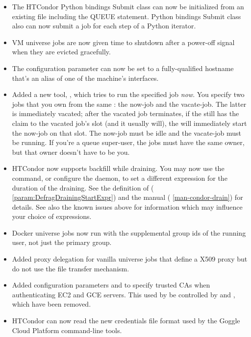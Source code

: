 \begin{itemize}

\item The HTCondor Python bindings Submit class can now be initialized from an existing
 file including the QUEUE statement.  Python bindings Submit
class also can now submit a job for each step of a Python iterator.

\item VM universe jobs are now given time to shutdown after a power-off
signal when they are evicted gracefully.

\item The  configuration parameter can now be
set to a fully-qualified hostname that's an alias of one of the machine's
interfaces.

\item Added a new tool, , which tries to run the specified job
\emph{now}.  You specify two jobs that you own from the same : the
now-job and the vacate-job.  The latter is immediately vacated; after the
vacated job terminates, if the  still has the claim to the vacated job's
slot (and it usually will), the  will immediately start the now-job on
that slot.  The now-job must be idle and the vacate-job must be running.  If
you're a queue super-user, the jobs must have the same owner, but that owner
doesn't have to be you.

\item HTCondor now supports backfill while draining.  You may now use the
 command, or configure the  daemon, to set a
different  expression for the duration of the draining.  See
the definition of  (
\ref{param:DefragDrainingStartExpr}) and the  manual (
\ref{man-condor-drain}) for details.  See also the known issues above for
information which may influence your choice of  expressions.

\item Docker universe jobs now run with the supplemental group ids of the
running user, not just the primary group.

\item Added proxy delegation for vanilla universe jobs that define a X509 proxy
but do not use the file transfer mechanism.

\item Added configuration parameters  and
 to specify trusted CAs when authenticating
EC2 and GCE servers.
This used by be controlled by  and
, which have been removed.

\item HTCondor can now read the new credentials file format used by
the Goggle Cloud Platform command-line tools.

\end{itemize}


